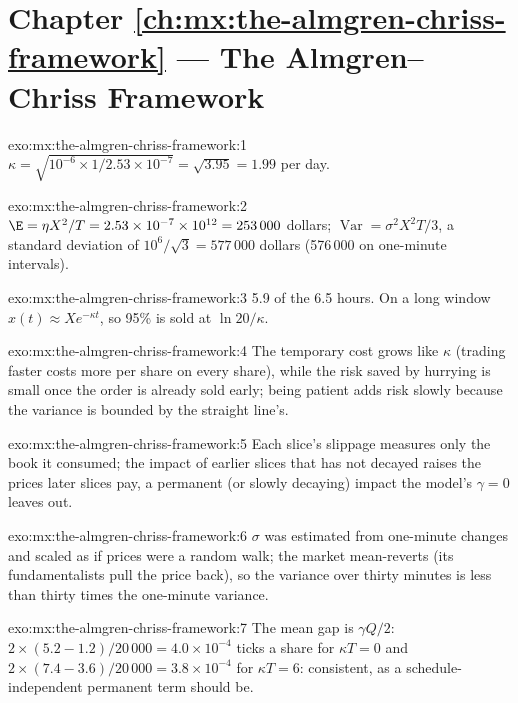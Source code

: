 \section*{Chapter \ref{ch:mx:the-almgren-chriss-framework} --- The Almgren--Chriss Framework}

\begin{solution}{exo:mx:the-almgren-chriss-framework:1}
$\kappa=\sqrt{10^{-6}\times1/2.53\times10^{-7}}=\sqrt{3.95}=1.99$ per day.
\end{solution}

\begin{solution}{exo:mx:the-almgren-chriss-framework:2}
$\E=\eta X^2/T=2.53\times10^{-7}\times10^{12}=253\,000$ dollars; $\operatorname{Var}=\sigma^2X^2T/3$, a standard deviation of $10^6/\sqrt3=577\,000$ dollars
(576\,000 on one-minute intervals).
\end{solution}

\begin{solution}{exo:mx:the-almgren-chriss-framework:3}
5.9 of the 6.5 hours. On a long window $x(t)\approx Xe^{-\kappa t}$, so 95\% is sold at $\ln20/\kappa$.
\end{solution}

\begin{solution}{exo:mx:the-almgren-chriss-framework:4}
The temporary cost grows like $\kappa$ (trading faster costs more per share on every share), while the risk saved by hurrying is small once the order is
already sold early; being patient adds risk slowly because the variance is bounded by the straight line's.
\end{solution}

\begin{solution}{exo:mx:the-almgren-chriss-framework:5}
Each slice's slippage measures only the book it consumed; the impact of earlier slices that has not decayed raises the prices later slices pay, a
permanent (or slowly decaying) impact the model's $\gamma=0$ leaves out.
\end{solution}

\begin{solution}{exo:mx:the-almgren-chriss-framework:6}
$\sigma$ was estimated from one-minute changes and scaled as if prices were a random walk; the market mean-reverts (its fundamentalists pull the price
back), so the variance over thirty minutes is less than thirty times the one-minute variance.
\end{solution}

\begin{solution}{exo:mx:the-almgren-chriss-framework:7}
The mean gap is $\gamma Q/2$: $2\times(5.2-1.2)/20\,000=4.0\times10^{-4}$ ticks a share for $\kappa T=0$ and $2\times(7.4-3.6)/20\,000=3.8\times10^{-4}$ for
$\kappa T=6$: consistent, as a schedule-independent permanent term should be.
\end{solution}

